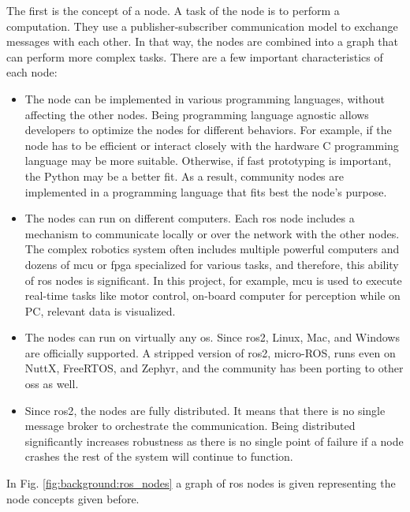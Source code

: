 The first is the concept of a node.
A task of the node is to perform a computation.
They use a publisher-subscriber communication model to exchange messages with each other. 
In that way, the nodes are combined into a graph that can perform more complex tasks. There are a few important characteristics of each node:
\begin{itemize}
    \item The node can be implemented in various programming languages, without affecting the other nodes. Being programming language agnostic allows developers to optimize the nodes for different behaviors. For example, if the node has to be efficient or interact closely with the hardware C programming language may be more suitable. Otherwise, if fast prototyping is important, the Python may be a better fit. As a result, community nodes are implemented in a programming language that fits best the node's purpose.
    \item The nodes can run on different computers. Each \ac{ros} node includes a mechanism to communicate locally or over the network with the other nodes. The complex robotics system often includes multiple powerful computers and dozens of \ac{mcu} or \ac{fpga} specialized for various tasks, and therefore, this ability of \ac{ros} nodes is significant. In this project, for example, \ac{mcu} is used to execute real-time tasks like motor control, on-board computer for perception while on PC, relevant data is visualized.
    \item The nodes can run on virtually any \ac{os}. Since \ac{ros2}, Linux, Mac, and Windows are officially supported. A stripped version of \ac{ros2}, micro-ROS, runs even on NuttX, FreeRTOS, and Zephyr, and the community has been porting to other \acp{os} as well.
    \item Since \ac{ros2}, the nodes are fully distributed. It means that there is no single message broker to orchestrate the communication. Being distributed significantly increases robustness as there is no single point of failure if a node crashes the rest of the system will continue to function.
\end{itemize}

In Fig. \ref{fig:background:ros_nodes} a graph of \ac{ros} nodes is given representing the node concepts given before.

